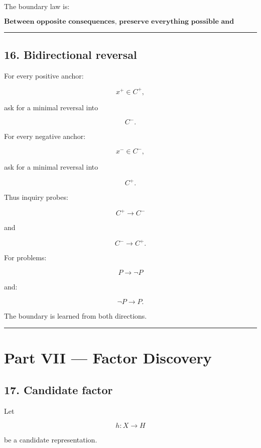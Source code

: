 \documentclass[
]{article}
\begin{document}
The boundary law is:

\[
\boxed{
\textbf{Between opposite consequences, preserve everything possible
and minimize the change that flips the consequence.}
}
\]

\begin{center}\rule{0.5\linewidth}{0.5pt}\end{center}

\subsection{16. Bidirectional reversal}\label{bidirectional-reversal}

For every positive anchor:

\[
x^+\in C^+,
\]

ask for a minimal reversal into

\[
C^-.
\]

For every negative anchor:

\[
x^-\in C^-,
\]

ask for a minimal reversal into

\[
C^+.
\]

Thus inquiry probes:

\[
\boxed{
C^+\to C^-
}
\]

and

\[
\boxed{
C^-\to C^+.
}
\]

For problems:

\[
P\to\neg P
\]

and:

\[
\neg P\to P.
\]

The boundary is learned from both directions.

\begin{center}\rule{0.5\linewidth}{0.5pt}\end{center}

\section{Part VII --- Factor Discovery}\label{part-vii-factor-discovery}

\subsection{17. Candidate factor}\label{candidate-factor}

Let

\[
h:X\to H
\]

be a candidate representation.
\end{document}
